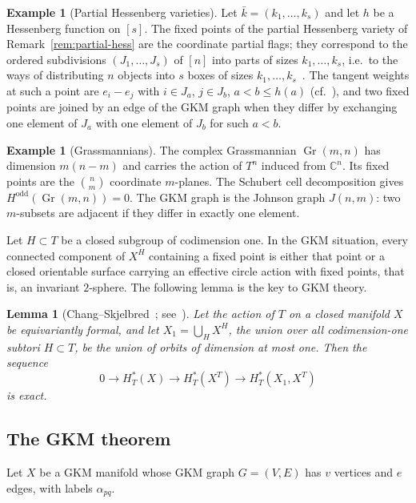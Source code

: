 \documentclass[11pt,a4paper]{article}
\numberwithin{equation}{section}
\theoremstyle{plain}
\newtheorem{lemma}[theorem]{Lemma}
\theoremstyle{definition}
\newtheorem{example}[theorem]{Example}
\theoremstyle{remark}
\newcommand{\C}{\mathbb{C}}
\newcommand{\HT}{H^{*}_{T}}
\DeclareMathOperator{\Gr}{Gr}
\begin{document}
\begin{example}[Partial Hessenberg varieties]
Let $\bar k=(k_1,\dots,k_s)$ and let $h$ be a Hessenberg function on $[s]$. The fixed points of the partial Hessenberg variety of Remark~\ref{rem:partial-hess} are the coordinate partial flags; they correspond to the ordered subdivisions $(J_1,\dots,J_s)$ of $[n]$ into parts of sizes $k_1,\dots,k_s$, i.e.\ to the ways of distributing $n$ objects into $s$ boxes of sizes $k_1,\dots,k_s$~\cite[Lem.~5.7]{AB24}. The tangent weights at such a point are $e_i-e_j$ with $i\in J_a$, $j\in J_b$, $a<b\leqslant h(a)$ (cf.~\cite[Prop.~5.8]{AB24}), and two fixed points are joined by an edge of the GKM graph when they differ by exchanging one element of $J_a$ with one element of $J_b$ for such $a<b$.
\end{example}

\begin{example}[Grassmannians]
The complex Grassmannian $\Gr(m,n)$ has dimension $m(n-m)$ and carries the action of $T^n$ induced from $\C^n$. Its fixed points are the $\binom nm$ coordinate $m$-planes. The Schubert cell decomposition gives $H^{\mathrm{odd}}(\Gr(m,n))=0$. The GKM graph is the Johnson graph $J(n,m)$: two $m$-subsets are adjacent if they differ in exactly one element.
\end{example}

Let $H\subset T$ be a closed subgroup of codimension one. In the GKM situation, every connected component of $X^H$ containing a fixed point is either that point or a closed orientable surface carrying an effective circle action with fixed points, that is, an invariant $2$-sphere. The following lemma is the key to GKM theory.

\begin{lemma}[Chang--Skjelbred~\cite{CS74}; see~\cite{GKM98}]\label{lem:CS}
Let the action of $T$ on a closed manifold $X$ be equivariantly formal, and let $X_1=\bigcup_HX^H$, the union over all codimension-one subtori $H\subset T$, be the union of orbits of dimension at most one. Then the sequence
\[
0\to\HT(X)\to\HT(X^T)\to\HT(X_1,X^T)
\]
is exact.
\end{lemma}

\subsection{The GKM theorem}

Let $X$ be a GKM manifold whose GKM graph $G=(V,E)$ has $v$ vertices and $e$ edges, with labels $\alpha_{pq}$.
\end{document}
